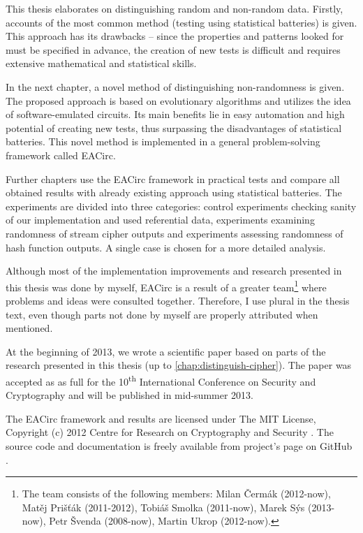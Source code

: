\documentclass[12pt,oneside]{fithesis2}		%
\renewcommand{\_}{\leavevmode \kern0.0em\vbox{\hrule width0.4em}}
\begin{document}
This thesis elaborates on distinguishing random and non-random data. Firstly, accounts of the most common method (testing using
statistical batteries) is given. This approach has its drawbacks -- since the properties and patterns looked for must be specified
in advance, the creation of new tests is difficult and requires extensive mathematical and statistical skills.

In the next chapter, a novel method of distinguishing non-randomness is given. The proposed approach is based on evolutionary
algorithms and utilizes the idea of software-emulated circuits. Its main benefits lie in easy automation and
high potential of creating new tests, thus surpassing the disadvantages of statistical batteries. 
This novel method is implemented in a general problem-solving framework called EACirc.

Further chapters use the EACirc framework in practical tests and compare all obtained results with already existing approach
using statistical batteries. The experiments are divided into three categories: control experiments checking sanity of our
implementation and used referential data, experiments examining randomness of stream cipher outputs and experiments
assessing randomness of hash function outputs. A single case is chosen for a more detailed analysis.

Although most of the implementation improvements and research presented in this thesis was done by myself, EACirc is
a result of a greater team\footnote{The team consists of the following members: Milan Čermák (2012-now), Matěj Prišťák (2011-2012),
Tobiáš Smolka (2011-now), Marek Sýs (2013-now), Petr Švenda (2008-now), Martin Ukrop (2012-now).}
where problems and ideas were consulted together. Therefore, I use plural in the thesis text,
even though parts not done by myself are properly attributed when mentioned.

At the beginning of 2013, we wrote a scientific paper based on parts of the research presented in this thesis
(up to \autoref{chap:distinguish-cipher}). The paper was accepted as as full for the 10\textsuperscript{th} International
Conference on Security and Cryptography and will be published in mid-summer 2013. \parencite{lab-paper}

The EACirc framework and results are licensed under The MIT License, Copyright (c) 2012 Centre for Research 
on Cryptography and Security \parencite{crocs}. The source code and documentation is freely available from project's page on GitHub 
\parencite{eacirc-github}.
\end{document}
